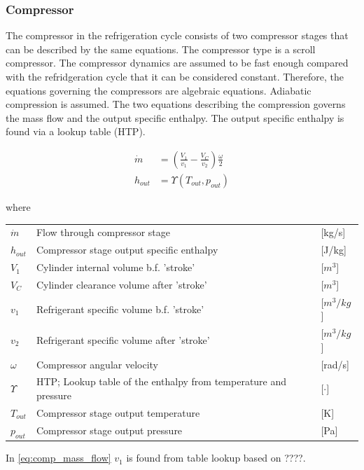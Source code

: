 \subsubsection{Compressor}
The compressor in the refrigeration cycle consists of two compressor stages that can be described by the same equations. The compressor type is a scroll compressor.
The compressor dynamics are assumed to be fast enough compared with the refridgeration cycle that it can be considered constant. Therefore, the equations governing the compressors are algebraic equations.
Adiabatic compression is assumed.
The two equations describing the compression governs the mass flow and the output specific enthalpy. The output specific enthalpy is found via a lookup table (HTP).

\begin{align}
	\dot{m} &= \left(\frac{V_1}{v_1} - \frac{V_C}{v_2}\right) \frac{\omega}{2} \\ \label{eq:comp_mass_flow}
	h_{out} &= \Upsilon(T_{out}, p_{out})
\end{align}

where

\begin{center}
	\begin{tabular}{l p{8cm} l}
		$\dot{m}$				& Flow through compressor stage					& [\si{kg}/\si{s}] \\
		$h_{out}$				& Compressor stage output specific enthalpy				& [\si{J}/\si{kg}] \\
		$V_1$					& Cylinder internal volume b.f. 'stroke'			& [$\si{m}^3$] \\
		$V_C$					& Cylinder clearance volume after 'stroke'		& [$\si{m}^3$] \\
		$v_1$					& Refrigerant specific volume b.f. 'stroke'		& [$\si{m}^3/\si{kg}$] \\
		$v_2$					& Refrigerant specific volume after 'stroke'		& [$\si{m}^3/\si{kg}$] \\
		$\omega$ 				& Compressor angular velocity 					& [\si{rad}/\si{s}]\\
		$\Upsilon$ 				& HTP; Lookup table of the enthalpy from temperature and pressure 			& [$\cdot]$ \\
		$T_{out}$ 				& Compressor stage output temperature 			& [\si{K}] \\
		$p_{out}$				& Compressor stage output pressure 				& [\si{Pa}]
	\end{tabular}
\end{center}

In \cref{eq:comp_mass_flow} $v_1$ is found from table lookup based on ????.

